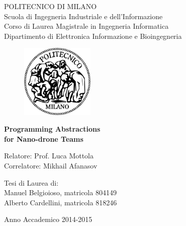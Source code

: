 \thispagestyle{empty}
\vspace*{-1.5cm} \bfseries{
\begin{center}
  \large
  POLITECNICO DI MILANO\\
  \normalsize
  Scuola di Ingegneria Industriale e dell'Informazione
  \\
  Corso di Laurea Magistrale in Ingegneria Informatica
  \\
  Dipartimento di Elettronica Informazione e Bioingegneria
  \\
  \vspace{5mm}
  \begin{figure}[htbp]
    \begin{center}
    \includegraphics[width=3.5cm]{pictures/logopm.png}
    \end{center}
  \end{figure}
  \vspace*{0.3cm} \LARGE



  \textbf{Programming Abstractions\\ for Nano-drone Teams}\\



  \vspace*{.75truecm} \large
\end{center}
\vspace*{3.0cm} \large
\begin{flushleft}


  Relatore: Prof. Luca Mottola \\
  Correlatore:  Mikhail Afanasov\\


\end{flushleft}
\vspace*{1.0cm}
\begin{flushright}


  Tesi di Laurea di:\\ Manuel Belgioioso, matricola 804149 \\ 
		       Alberto Cardellini, matricola 818246  \\


\end{flushright}
\vspace*{0.5cm}
\begin{center}



  Anno Accademico 2014-2015
\end{center} \clearpage
}